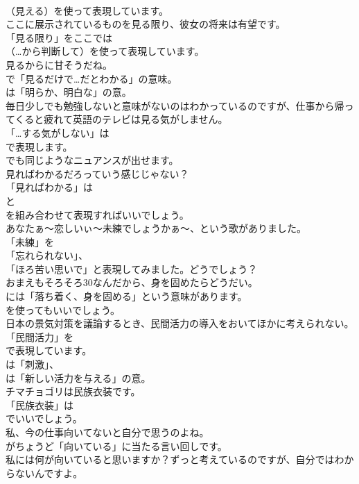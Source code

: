 \documentclass[8pt]{extreport}
\begin{document}
\begin{CJK}{UTF8}{min}
\\	（見える）を使って表現しています。	
\\	ここに展示されているものを見る限り、彼女の将来は有望です。 
\\	「見る限り」をここでは
\\	（…から判断して）を使って表現しています。	
\\	見るからに甘そうだね。 
\\	で「見るだけで…だとわかる」の意味。
\\	は「明らか、明白な」の意。	
\\	毎日少しでも勉強しないと意味がないのはわかっているのですが、仕事から帰ってくると疲れて英語のテレビは見る気がしません。 
\\	「…する気がしない」は 
\\	で表現します。
\\	でも同じようなニュアンスが出せます。	
\\	見ればわかるだろっていう感じじゃない？ 
\\	「見ればわかる」は
\\	と
\\	を組み合わせて表現すればいいでしょう。	
\\	あなたぁ～恋しいぃ～未練でしょうかぁ～、という歌がありました。 
\\	「未練」を
\\	「忘れられない」、
\\	「ほろ苦い思いで」と表現してみました。どうでしょう？	
\\	おまえもそろそろ30なんだから、身を固めたらどうだい。 
\\	には「落ち着く、身を固める」という意味があります。
\\	を使ってもいいでしょう。	
\\	日本の景気対策を議論するとき、民間活力の導入をおいてほかに考えられない。 
\\	「民間活力」を 
\\	で表現しています。
\\	は「刺激」、
\\	は「新しい活力を与える」の意。	
\\	チマチョゴリは民族衣装です。 
\\	「民族衣装」は 
\\	でいいでしょう。	
\\	私、今の仕事向いてないと自分で思うのよね。 
\\	がちょうど「向いている」に当たる言い回しです。	
\\	私には何が向いていると思いますか？ずっと考えているのですが、自分ではわからないんですよ。 

\end{CJK}
\end{document}
